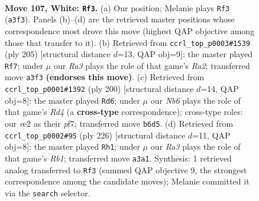 \documentclass[11pt]{article}
\begin{document}
\clearpage

\begin{figure}[p]\centering
\begin{subfigure}{0.46\textwidth}\centering
\resizebox{\linewidth}{!}{%
\newchessgame
\chessboard[
  setfen={8/6pk/1N3p2/7p/7P/R5PK/4r3/8 w - - 38 107},
  showmover=false,
  pgfstyle=straightmove, color=movearrow, markmove={a3-f3}
]}
\caption{}
\end{subfigure}\hfill
\begin{subfigure}{0.46\textwidth}\centering
\resizebox{\linewidth}{!}{%
\newchessgame
\chessboard[
  setfen={8/r7/6pk/7p/2R4P/4KPP1/8/8 b - - 73 103},
  showmover=false,
  pgfstyle=straightmove, color=movearrow, markmove={a7-f7}
]}
\caption{}
\end{subfigure}
\\[4pt]
\begin{subfigure}{0.46\textwidth}\centering
\resizebox{\linewidth}{!}{%
\newchessgame
\chessboard[
  setfen={8/5pk1/6p1/7p/3R3P/6P1/5PK1/1r6 w - - 19 101},
  showmover=false,
  pgfstyle=straightmove, color=movearrow, markmove={d4-d6}
]}
\caption{}
\end{subfigure}\hfill
\begin{subfigure}{0.46\textwidth}\centering
\resizebox{\linewidth}{!}{%
\newchessgame
\chessboard[
  setfen={6k1/5p2/4pP2/4P3/4PK2/r7/8/1R6 w - - 43 114},
  showmover=false,
  pgfstyle=straightmove, color=movearrow, markmove={b1-h1}
]}
\caption{}
\end{subfigure}
\caption{\textbf{Move 107, White: \texttt{Rf3}.} (a) Our position; Melanie plays \texttt{Rf3} (\texttt{a3f3}). Panels (b)--(d) are the retrieved master positions whose correspondence most drove this move (highest QAP objective among those that transfer to it). (b) Retrieved from \texttt{ccrl\_top\_p0003\#1539} (ply 205) [structural distance $d$=13, QAP obj=9]: the master played \texttt{Rf7}; under $\mu$ our \emph{Ra3} plays the role of that game's \emph{Ra2}; transferred move \texttt{a3f3} \textbf{(endorses this move)}. (c) Retrieved from \texttt{ccrl\_top\_p0001\#1392} (ply 200) [structural distance $d$=14, QAP obj=8]: the master played \texttt{Rd6}; under $\mu$ our \emph{Nb6} plays the role of that game's \emph{Rd4} (a \textbf{cross-type} correspondence); cross-type roles: our \emph{r}e2 as their \emph{p}f7; transferred move \texttt{b6d5}. (d) Retrieved from \texttt{ccrl\_top\_p0002\#95} (ply 226) [structural distance $d$=11, QAP obj=8]: the master played \texttt{Rh1}; under $\mu$ our \emph{Ra3} plays the role of that game's \emph{Rb1}; transferred move \texttt{a3a1}. Synthesis: 1 retrieved analog transferred to \texttt{Rf3} (summed QAP objective 9, the strongest correspondence among the candidate moves); Melanie committed it via the \texttt{search} selector.}
\label{fig:thought-m212}
\end{figure}
\end{document}
